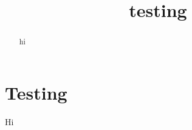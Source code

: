 \documentclass[]{article}
\title{testing}
\author{}
\begin{document}
\maketitle

\begin{abstract}
hi
\end{abstract}

\section{Testing}
Hi
\end{document}
